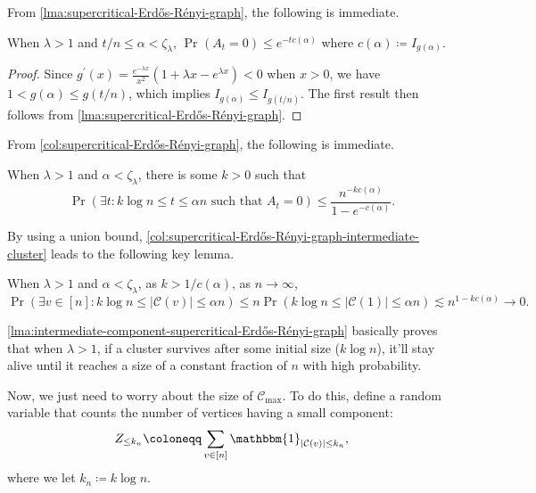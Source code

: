 From \autoref{lma:supercritical-Erdős-Rényi-graph}, the following is immediate.

\begin{corollary}\label{col:supercritical-Erdős-Rényi-graph}
	When \(\lambda > 1\) and \(t / n \leq \alpha < \zeta _\lambda \), \(\Pr_{}(A_t = 0) \leq e^{-t c(\alpha )} \) where \(c(\alpha ) \coloneqq I_{g(\alpha )}\).
\end{corollary}
\begin{proof}
	Since \(g^{\prime} (x) = \frac{e^{-\lambda x}}{x^{2} } (1 + \lambda x - e^{\lambda x}) < 0\) when \(x > 0\), we have \(1 < g(\alpha ) \leq g(t / n)\), which implies \(I_{g(\alpha )} \leq I_{g(t / n)}\). The first result then follows from \autoref{lma:supercritical-Erdős-Rényi-graph}.
\end{proof}

From \autoref{col:supercritical-Erdős-Rényi-graph}, the following is immediate.

\begin{corollary}\label{col:supercritical-Erdős-Rényi-graph-intermediate-cluster}
	When \(\lambda > 1\) and \(\alpha < \zeta _\lambda \), there is some \(k > 0\) such that
	\[
		\Pr_{}(\exists t\colon k \log n \leq t \leq \alpha n \text{ such that } A_t = 0)
		\leq \frac{n^{-k c(\alpha )}}{1 - e^{-c(\alpha )}}.
	\]
\end{corollary}

By using a union bound, \autoref{col:supercritical-Erdős-Rényi-graph-intermediate-cluster} leads to the following key lemma.

\begin{lemma}\label{lma:intermediate-component-supercritical-Erdős-Rényi-graph}
	When \(\lambda > 1\) and \(\alpha < \zeta _{\lambda }\), as \(k > 1 / c(\alpha )\), as \(n \to \infty \),
	\[
		\Pr_{}(\exists v \in [n] \colon k \log n \leq \lvert \mathcal{C} (v) \rvert \leq \alpha n)
		\leq n \Pr_{}(k \log n \leq \lvert \mathcal{C} (1) \rvert \leq \alpha n)
		\lesssim n^{1 - k c(\alpha )}
		\to 0.
	\]
\end{lemma}

\begin{remark}
	\autoref{lma:intermediate-component-supercritical-Erdős-Rényi-graph} basically proves that when \(\lambda > 1\), if a cluster survives after some initial size (\(k \log n\)), it'll stay alive until it reaches a size of a constant fraction of \(n\) with high probability.
\end{remark}

Now, we just need to worry about the size of \(\mathcal{C} _{\max }\). To do this, define a random variable that counts the number of vertices having a small component:
\[
	Z_{\leq k_n}
	\coloneqq \sum_{v \in [n]} \mathbbm{1}_{\lvert \mathcal{C} (v) \rvert \leq k_n},
\]
where we let \(k_n \coloneqq k \log n\).

